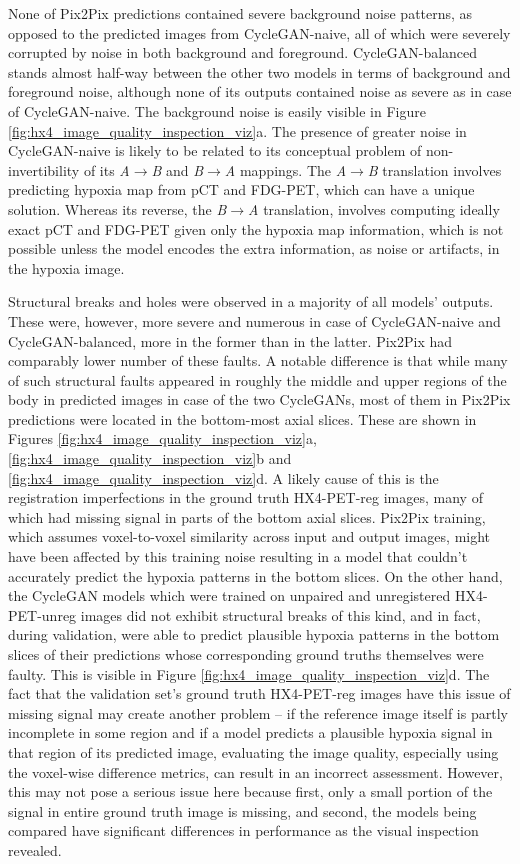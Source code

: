 None of Pix2Pix predictions contained severe background noise patterns, as opposed to the predicted images from CycleGAN-naive, all of which were severely corrupted by noise in both background and foreground. CycleGAN-balanced stands almost half-way between the other two models in terms of background and foreground noise, although none of its outputs contained noise as severe as in case of CycleGAN-naive. The background noise is easily visible in Figure \ref{fig:hx4_image_quality_inspection_viz}a. The presence of greater noise in CycleGAN-naive is likely to be related to its conceptual problem of non-invertibility of its \textit{A}$\rightarrow$\textit{B} and \textit{B}$\rightarrow$\textit{A} mappings. The \textit{A}$\rightarrow$\textit{B} translation involves predicting hypoxia map from pCT and FDG-PET, which can have a unique solution. Whereas its reverse, the \textit{B}$\rightarrow$\textit{A} translation, involves computing ideally exact pCT and FDG-PET given only the hypoxia map information, which is not possible unless the model encodes the extra information, as noise or artifacts, in the hypoxia image.

Structural breaks and holes were observed in a majority of all models' outputs. These were, however, more severe and numerous in case of CycleGAN-naive and CycleGAN-balanced, more in the former than in the latter. Pix2Pix had comparably lower number of these faults. A notable difference is that while many of such structural faults appeared in roughly the middle and upper regions of the body in predicted images in case of the two CycleGANs, most of them in Pix2Pix predictions were located in the bottom-most axial slices. These are shown in Figures \ref{fig:hx4_image_quality_inspection_viz}a, \ref{fig:hx4_image_quality_inspection_viz}b and \ref{fig:hx4_image_quality_inspection_viz}d. A likely cause of this is the registration imperfections in the ground truth HX4-PET-reg images, many of which had missing signal in parts of the bottom axial slices. Pix2Pix training, which assumes voxel-to-voxel similarity across input and output images, might have been affected by this training noise resulting in a model that couldn't accurately predict the hypoxia patterns in the bottom slices. On the other hand, the CycleGAN models which were trained on unpaired and unregistered HX4-PET-unreg images did not exhibit structural breaks of this kind, and in fact, during validation, were able to predict plausible hypoxia patterns in the bottom slices of their predictions whose corresponding ground truths themselves were faulty. This is visible in Figure \ref{fig:hx4_image_quality_inspection_viz}d. The fact that the validation set's ground truth HX4-PET-reg images have this issue of missing signal may create another problem -- if the reference image itself is partly incomplete in some region and if a model predicts a plausible hypoxia signal in that region of its predicted image, evaluating the image quality, especially using the voxel-wise difference metrics, can result in an incorrect assessment. However, this may not pose a serious issue here because first, only a small portion of the signal in entire ground truth image is missing, and second, the models being compared have significant differences in performance as the visual inspection revealed.

